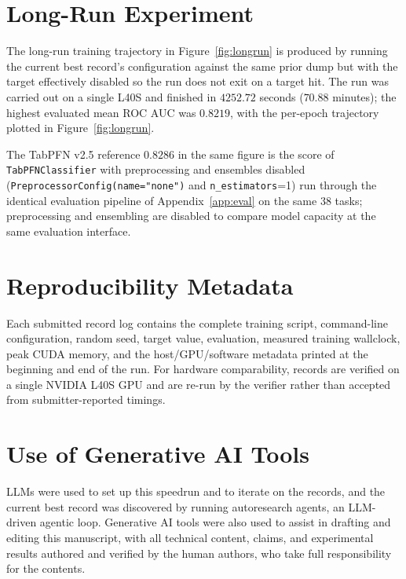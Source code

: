 \documentclass{article}
\theoremstyle{plain}
\theoremstyle{definition}
\theoremstyle{remark}
\begin{document}
\section{Long-Run Experiment}
\label{app:longrun}
The long-run training trajectory in Figure~\ref{fig:longrun} is produced by running the current best record's configuration against the same prior dump but with the target effectively disabled so the run does not exit on a target hit.
The run was carried out on a single L40S and finished in $4252.72$ seconds ($70.88$ minutes); the highest evaluated mean ROC AUC was $0.8219$, with the per-epoch trajectory plotted in Figure~\ref{fig:longrun}.

The TabPFN v2.5 reference $0.8286$ in the same figure is the score of \texttt{TabPFNClassifier} with preprocessing and ensembles disabled (\texttt{PreprocessorConfig(name="none")} and \texttt{n\_estimators}{=}1) run through the identical evaluation pipeline of Appendix~\ref{app:eval} on the same 38 tasks; preprocessing and ensembling are disabled to compare model capacity at the same evaluation interface.

\section{Reproducibility Metadata}
\label{app:repro-metadata}
Each submitted record log contains the complete training script, command-line configuration, random seed, target value, evaluation, measured training wallclock, peak CUDA memory, and the host/GPU/software metadata printed at the beginning and end of the run.
For hardware comparability, records are verified on a single NVIDIA L40S GPU and are re-run by the verifier rather than accepted from submitter-reported timings.

\section{Use of Generative AI Tools}
\label{app:genai-usage}
LLMs were used to set up this speedrun and to iterate on the records, and the current best record was discovered by running autoresearch agents, an LLM-driven agentic loop.
Generative AI tools were also used to assist in drafting and editing this manuscript, with all technical content, claims, and experimental results authored and verified by the human authors, who take full responsibility for the contents.
\end{document}
